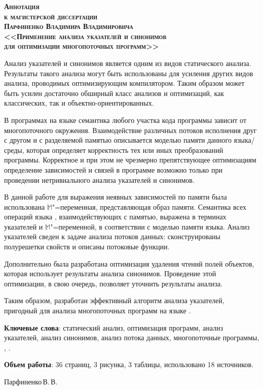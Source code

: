 \documentclass[12pt]{article}
\begin{document}
  \thispagestyle{empty}

  \begin{center}
    \scshape \bfseries
    {\Large Аннотация}\\
    к магистерской диссертации\\
    Парфиненко Владимира Владимировича\\
    {\large
      <<Применение анализа указателей и синонимов\\
      для оптимизации многопоточных программ>>\\
    }
  \end{center}

  Анализ указателей и синонимов является одним из видов статического анализа.
  Результаты такого анализа могут быть использованы для усиления других видов
  анализа, проводимых оптимизирующим компилятором.
  Таким образом может быть усилен достаточно обширный класс анализов и
  оптимизаций, как классических, так и объектно-ориентированных.

  В программах на языке  семантика любого участка кода программы
  зависит от многопоточного окружения.
  Взаимодействие различных потоков исполнения друг с другом и с разделяемой
  памятью описывается моделью памяти данного языка\slash{}среды, которая
  определяет корректность тех или иных преобразований программы.
  Корректное и при этом не чрезмерно препятствующее оптимизациям определение
  зависимостей и связей в программе возможно только при проведении
  нетривиального анализа указателей и синонимов.

  В данной работе для выражения неявных зависимостей по памяти была
  использована $\mathbb{M}$"=переменная, представляющая образ памяти.
  Семантика всех операций языка , взаимодействующих с памятью,
  выражена в терминах указателей и $\mathbb{M}$"=переменной, в соответствии с
  моделью памяти языка.
  Анализ указателей сведен к задаче анализа потоков данных: сконструированы
  полурешетки свойств и описаны потоковые функции.

  Дополнительно была разработана оптимизация удаления чтений полей объектов,
  которая использует результаты анализа синонимов.
  Проведение этой оптимизации, в свою очередь, позволяет уточнить результаты
  анализа.

  Таким образом, разработан эффективный алгоритм анализа указателей, пригодный
  для анализа многопоточных программ на языке .

  \vspace{0.5cm}

  \textbf{Ключевые слова}: статический анализ, оптимизация программ, анализ
  указателей, анализ синонимов, анализ потока данных, многопоточные программы,
  , .

  \textbf{Объем работы}: 36 страниц, 3 рисунка, 3 таблицы, использовано 18
  источников.

  \begin{flushright}
    Парфиненко\,В.\,В.
  \end{flushright}
\end{document}

